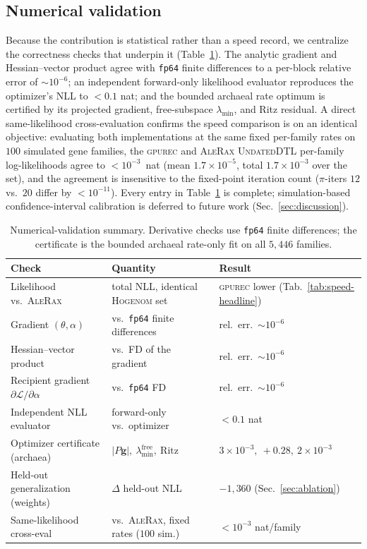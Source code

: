\documentclass[11pt]{article}
\newcommand{\toolname}{\textsc{gpurec}\xspace}
\newcommand{\NLL}{\mathcal{L}}
\newcommand{\grad}{\mathbf{g}}
\begin{document}
\subsection{Numerical validation}
\label{sec:validation}
Because the contribution is statistical rather than a speed record, we centralize the
correctness checks that underpin it (Table~\ref{tab:validation}). The analytic
gradient and Hessian--vector product agree with \texttt{fp64} finite differences to a
per-block relative error of $\sim\!10^{-6}$; an independent forward-only likelihood
evaluator reproduces the optimizer's NLL to $<\!0.1$ nat; and the bounded archaeal
rate optimum is certified by its projected gradient, free-subspace $\lambda_{\min}$,
and Ritz residual. A direct same-likelihood cross-evaluation confirms the speed
comparison is on an identical objective: evaluating both implementations at the same
fixed per-family rates on $100$ simulated gene families, the \toolname and
\textsc{AleRax} \textsc{UndatedDTL} per-family log-likelihoods agree to $<\!10^{-3}$~nat
(mean $1.7\!\times\!10^{-5}$, total $1.7\!\times\!10^{-3}$ over the set), and the
agreement is insensitive to the fixed-point iteration count ($\pi$-iters $12$ vs.\ $20$
differ by $<\!10^{-11}$). Every entry in Table~\ref{tab:validation} is complete;
simulation-based confidence-interval calibration is deferred to future work
(Sec.~\ref{sec:discussion}).

\begin{table}[h]\centering
\caption{Numerical-validation summary. Derivative checks use \texttt{fp64} finite
differences; the certificate is the bounded archaeal rate-only fit on all
$5{,}446$ families.}
\label{tab:validation}
\small
\begin{tabular}{lll}
\toprule
Check & Quantity & Result \\
\midrule
Likelihood vs.\ \textsc{AleRax}        & total NLL, identical \textsc{Hogenom} set & \toolname lower (Tab.~\ref{tab:speed-headline}) \\
Gradient $(\theta,\alpha)$             & vs.\ \texttt{fp64} finite differences     & rel.\ err.\ $\sim\!10^{-6}$ \\
Hessian--vector product                & vs.\ FD of the gradient                   & rel.\ err.\ $\sim\!10^{-6}$ \\
Recipient gradient $\partial\NLL/\partial\alpha$ & vs.\ \texttt{fp64} FD            & rel.\ err.\ $\sim\!10^{-6}$ \\
Independent NLL evaluator              & forward-only vs.\ optimizer               & $<\!0.1$ nat \\
Optimizer certificate (archaea)        & $|P\grad|,\ \lambda^{\mathrm{free}}_{\min},\ \mathrm{Ritz}$ & $3\!\times\!10^{-3},\ {+}0.28,\ 2\!\times\!10^{-3}$ \\
Held-out generalization (weights)      & $\Delta$ held-out NLL                     & $-1{,}360$ (Sec.~\ref{sec:ablation}) \\
Same-likelihood cross-eval             & vs.\ \textsc{AleRax}, fixed rates ($100$ sim.) & $<\!10^{-3}$ nat/family \\
\bottomrule
\end{tabular}
\end{table}
\end{document}
